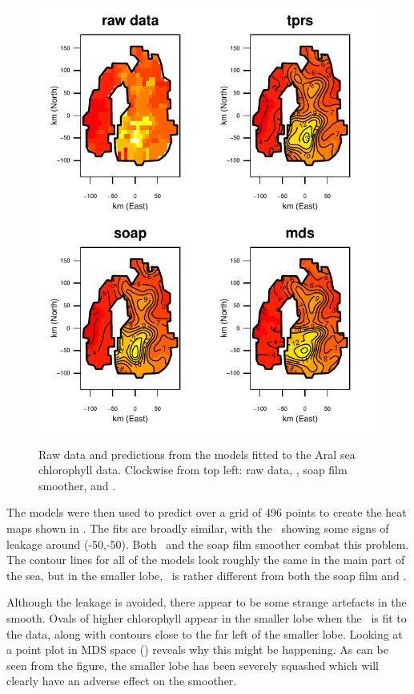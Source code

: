 \begin{figure}
\centering
\includegraphics{mds/figs/aral-fit.pdf} \\
\caption{Raw data and predictions from the models fitted to the Aral sea chlorophyll data. Clockwise from top left: raw data, \tprs, soap film smoother, and \mdsap.}
\label{aral-fit}
\end{figure}

The models were then used to predict over a grid of 496 points to create the heat maps shown in . The fits are broadly similar, with the \tprs\ showing some signs of leakage around (-50,-50). Both \mdsap\ and the soap film smoother combat this problem. The contour lines for all of the models look roughly the same in the main part of the sea, but in the smaller lobe, \mdsap\ is rather different from both the soap film and \tprs. 

Although the leakage is avoided, there appear to be some strange artefacts in the smooth. Ovals of higher chlorophyll appear in the smaller lobe when the \mdsap\ is fit to the data, along with contours close to the far left of the smaller lobe. Looking at a point plot in MDS space () reveals why this might be happening. As can be seen from the figure, the smaller lobe has been severely squashed which will clearly have an adverse effect on the smoother.

